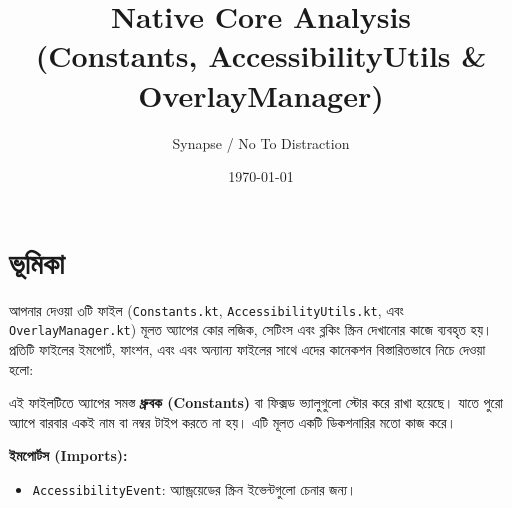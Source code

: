 \documentclass[12pt, a4paper]{article}
\title{\textbf{\Large Native Core Analysis\\ (Constants, AccessibilityUtils \& OverlayManager)}}
\author{Synapse / No To Distraction}
\date{\today}
\begin{document}
\maketitle

\section*{ভূমিকা}
আপনার দেওয়া ৩টি ফাইল (\texttt{Constants.kt}, \texttt{AccessibilityUtils.kt}, এবং \texttt{OverlayManager.kt}) মূলত অ্যাপের কোর লজিক, সেটিংস এবং ব্লকিং স্ক্রিন দেখানোর কাজে ব্যবহৃত হয়। প্রতিটি ফাইলের ইমপোর্ট, ফাংশন, এবং এবং অন্যান্য ফাইলের সাথে এদের কানেকশন বিস্তারিতভাবে নিচে দেওয়া হলো:

\vspace{0.5cm}

\begin{tcolorbox}[colback=blue!5!white,colframe=blue!75!black,title={১. Constants.kt}]
এই ফাইলটিতে অ্যাপের সমস্ত \textbf{ধ্রুবক (Constants)} বা ফিক্সড ভ্যালুগুলো স্টোর করে রাখা হয়েছে। যাতে পুরো অ্যাপে বারবার একই নাম বা নম্বর টাইপ করতে না হয়। এটি মূলত একটি ডিকশনারির মতো কাজ করে।

\textbf{ইমপোর্টস (Imports):}
\begin{itemize}[label=$\circ$]
    \item \texttt{AccessibilityEvent}: অ্যান্ড্রয়েডের স্ক্রিন ইভেন্টগুলো চেনার জন্য।
\end{itemize}


\end{tcolorbox}
\end{document}
